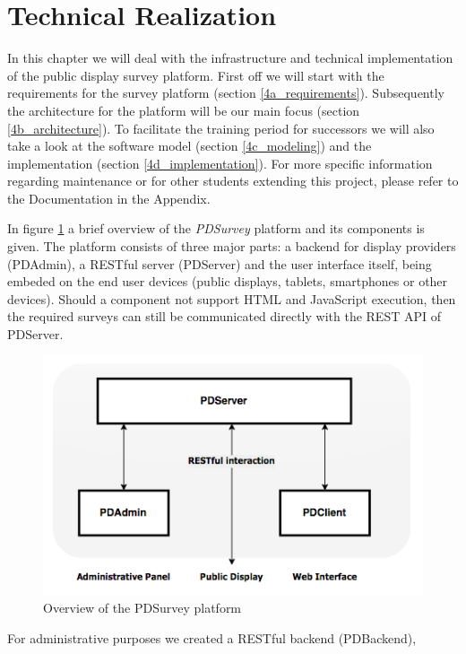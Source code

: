 \section{Technical Realization}

In this chapter we will deal with the infrastructure and technical implementation of the public display survey platform. First off we will start with the requirements for the survey platform (section \ref{4a_requirements}). Subsequently the architecture for the platform will be our main focus (section \ref{4b_architecture}). To facilitate the training period for successors we will also take a look at the software model (section \ref{4c_modeling}) and the implementation (section \ref{4d_implementation}). For more specific information regarding maintenance or for other students extending this project, please refer to the Documentation in the Appendix.

In figure \ref{fig:4-pdsurvey-platform} a brief overview of the \textit{PDSurvey} platform and its components is given. The platform consists of three major parts: a backend for display providers (PDAdmin), a RESTful server (PDServer) and the user interface itself, being embeded on the end user devices (public displays, tablets, smartphones or other devices). Should a component not support HTML and JavaScript execution, then the required surveys can still be communicated directly with the REST API of PDServer.

\begin{figure}%
    \begin{center}
        \includegraphics[width=.7\columnwidth]{img/4_implementation/4-overview}
    \end{center}
 \caption{Overview of the PDSurvey platform}
 \label{fig:4-pdsurvey-platform}
\end{figure}

 For administrative purposes we created a RESTful backend (PDBackend), 


